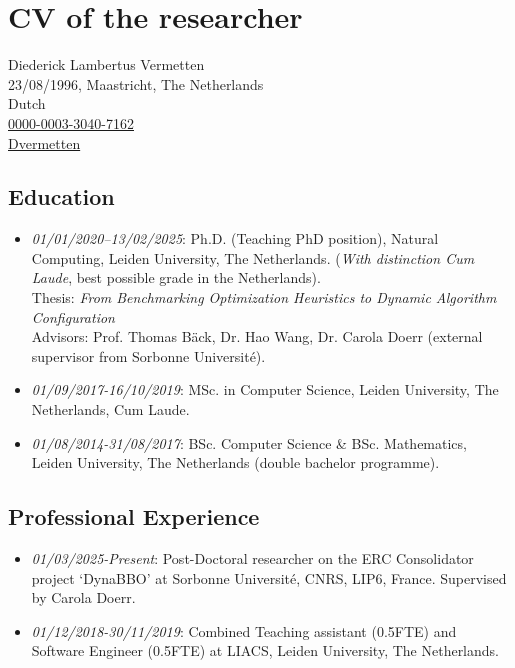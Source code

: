 \section{CV of the researcher}

 Diederick Lambertus Vermetten\\
 23/08/1996, Maastricht, The Netherlands\\
 Dutch\\
 \href{https://orcid.org/0000-0003-3040-7162}{0000-0003-3040-7162}\\
 \href{https://github.com/Dvermetten}{Dvermetten}


\subsection*{Education}

\begin{itemize}
    \item[] \textit{01/01/2020–13/02/2025}: Ph.D. (Teaching PhD position), Natural Computing, Leiden University, The Netherlands. (\emph{With distinction Cum Laude}, best possible grade in the Netherlands).  \\ Thesis: \textit{From Benchmarking Optimization Heuristics to Dynamic Algorithm Configuration} \\ Advisors: Prof. Thomas Bäck, Dr. Hao Wang, Dr. Carola Doerr (external supervisor from Sorbonne Universit\'e).
    \item[] \textit{01/09/2017-16/10/2019}: MSc. in Computer Science, Leiden University, The Netherlands, Cum Laude.
    \item[] \textit{01/08/2014-31/08/2017}: BSc. Computer Science \& BSc. Mathematics, Leiden University, The Netherlands (double bachelor programme).
\end{itemize}

\subsection*{Professional Experience}
\begin{itemize}
    \item[] \textit{01/03/2025-Present}: Post-Doctoral researcher on the ERC Consolidator project `DynaBBO' at Sorbonne Universit\'e, CNRS, LIP6, France. Supervised by Carola Doerr.
    \item[] \textit{01/12/2018-30/11/2019}: Combined Teaching assistant (0.5FTE) and Software Engineer (0.5FTE) at LIACS, Leiden University, The Netherlands.
\end{itemize}


